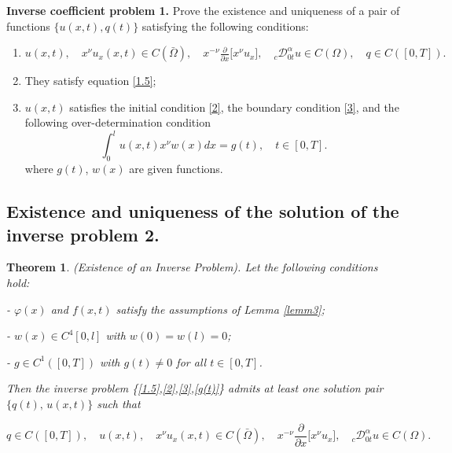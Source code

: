 \documentclass[reqno]{amsart}
\newtheorem{thm}{Theorem}[section]
\theoremstyle{definition}
\numberwithin{equation}{section}
\begin{document}
\textbf{Inverse coefficient problem 1.}
Prove the existence and uniqueness of a pair of functions $\{u(x,t), q(t)\}$ satisfying the following conditions:
\begin{enumerate}
    \item $u(x,t),\quad x^\nu u_x(x,t) \in C(\bar{\Omega}), \quad
x^{-\nu}\frac{\partial}{\partial x}\bigl[x^\nu u_x\bigr],\quad
_
{c}\mathcal{D}_{0t}^\alpha u \in C(\Omega) ,\quad q \in C([0,T]).$
    \item They satisfy equation \eqref{1.5};
    \item $u (x, t)$ satisfies the initial condition \eqref{2}, the boundary condition \eqref{3}, and the following over-determination condition
    \begin{equation}\label{g(t)}
    \int_0^l u(x, t)x^{\nu} w(x) d x=g(t), \quad t \in[0, T].
\end{equation}
where $g(t)$, $w(x)$ are given functions.
\end{enumerate}


\subsection{ Existence and uniqueness of the solution of the inverse problem 2.}

\begin{thm}\label{T4.3}(Existence of an Inverse Problem).  Let the following conditions hold:

- $\varphi(x)$ and $f(x,t)$ satisfy the assumptions of Lemma \ref{lemm3};

- $w(x) \in C^4[0,l]$ with $w(0) = w(l) = 0$;

- $g \in C^1([0,T])$ with $g(t) \neq 0$ for all $t \in [0,T]$.

Then the inverse problem \{\eqref{1.5},\eqref{2},\eqref{3},\eqref{g(t)}\} admits at least one solution pair
$\{q(t),\, u(x,t)\}$ such that

\begin{equation*}
    q \in C([0,T]),\quad u(x,t),\quad x^\nu u_x(x,t) \in C(\bar{\Omega}), \quad
x^{-\nu}\frac{\partial}{\partial x}\bigl[x^\nu u_x\bigr],\quad
_
{c}\mathcal{D}_{0t}^\alpha u \in C(\Omega).
\end{equation*}                                               
\end{thm} 
\end{document}
